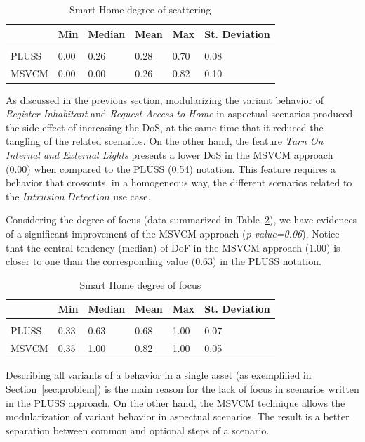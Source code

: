 \begin{table}[htb]
\centering
\caption{Smart Home degree of scattering}
\label{tab:sh-dos}
\begin{small}
\begin{tabular}{llllll} \hline
					& Min 	& Median 	& Mean 	& Max 	& St. Deviation \\ \hline \\
	PLUSS			& 0.00  & 0.26   	& 0.28  & 0.70 	& 0.08 			\\
	MSVCM	& 0.00  & 0.00  	& 0.26 	& 0.82 & 0.10  		\\ \hline	
\end{tabular}
\end{small}
\end{table}

As discussed in the previous section, modularizing the variant behavior of
\emph{Register Inhabitant} and \emph{Request Access to Home} in aspectual
scenarios produced the side effect of increasing the DoS, at the same time that it reduced
the tangling of the related scenarios. On the other hand, the feature \emph{Turn
On Internal and External Lights} presents a lower DoS in the MSVCM approach
(0.00) when compared to the PLUSS (0.54) notation. This feature requires a
behavior that crosscuts, in a homogeneous way, the different scenarios related to
the $Intrusion\ Detection$ use case.


Considering the degree of focus (data summarized in Table~\ref{tab:sh-dof}), we
have evidences of a significant improvement of the MSVCM approach
(\emph{p-value=0.06}). Notice that the central tendency (median) of DoF in the
MSVCM approach ($1.00$) is closer to one than the corresponding value
($0.63$) in the PLUSS notation.

\begin{table}[htb] \centering
\caption{Smart Home degree of focus}
\label{tab:sh-dof}
\begin{small}
\begin{tabular}{llllll} \hline
					& Min 	& Median 	& Mean 	& Max 	& St. Deviation \\ \hline \\
	PLUSS			& 0.33  & 0.63   	& 0.68  & 1.00 	& 0.07 			\\
	MSVCM			& 0.35  & 1.00   	& 0.82 	& 1.00 	& 0.05			\\ \hline	
\end{tabular}
\end{small}
\end{table}

Describing all variants of a behavior in a single asset
(as exemplified in Section~\ref{sec:problem}) is the main reason for the lack of
focus in scenarios written in the PLUSS approach. On the other hand, the MSVCM technique
allows the modularization of variant behavior in aspectual scenarios. The result
is a better separation between common and optional steps of a scenario.

